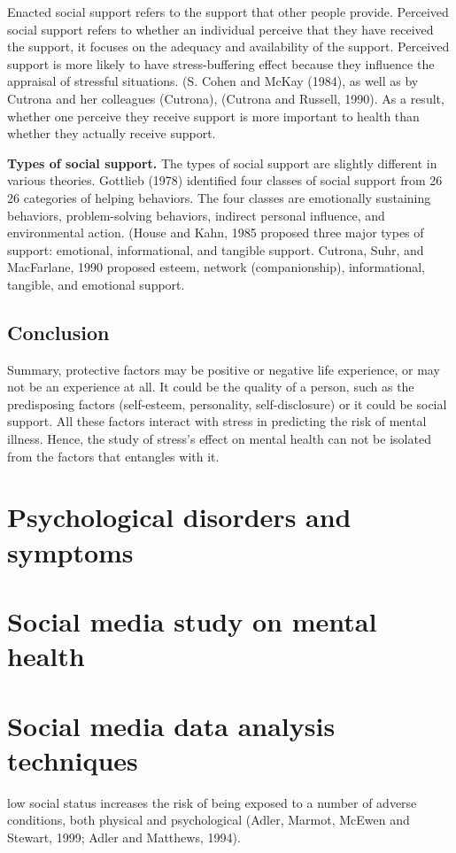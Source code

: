 Enacted social support refers to the support that other people provide. Perceived social support refers to whether an individual perceive that they have received the support, it focuses on the adequacy and availability of the support.  Perceived support is more likely to have stress-buffering effect because they influence the appraisal of stressful situations. (S. Cohen and McKay (1984), as well as by Cutrona and her colleagues (Cutrona), (Cutrona
and Russell, 1990). As a result, whether one perceive they receive support is more important to health than whether they actually receive support. 


\textbf{Types of social support.} The types of social support are slightly different in various theories. Gottlieb (1978) identified four classes of social support from 26  26 categories of helping behaviors. The four classes are emotionally sustaining behaviors, problem-solving behaviors, indirect personal influence, and environmental action. (House and Kahn, 1985 proposed three major types of support: emotional, informational, and tangible support. Cutrona, Suhr, and MacFarlane, 1990 proposed esteem, network (companionship), informational, tangible, and emotional support.


\subsection{Conclusion}
Summary, protective factors may be positive or negative life experience, or may not be an experience at all. It could be the quality of a person, such as the predisposing factors (self-esteem, personality, self-disclosure) or it could be social support. All these factors interact with stress in predicting the risk of mental illness. Hence, the study of stress's effect on mental health can not be isolated from the factors that entangles with it. 


\section{Psychological disorders and symptoms}



\section{Social media study on mental health}



\section{Social media data analysis techniques}

low social status increases the risk of being exposed to a number of adverse conditions, both physical and psychological (Adler, Marmot, McEwen and Stewart, 1999; Adler and Matthews, 1994). 











